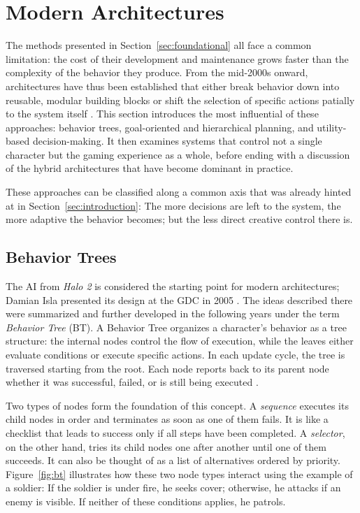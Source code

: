 \section{Modern Architectures}
\label{sec:modern}

The methods presented in Section~\ref{sec:foundational} all face a common limitation: the cost of their development and maintenance grows faster than the complexity of the behavior they produce. From the mid-2000s onward, architectures have thus been established that either break behavior down into reusable, modular building blocks or shift the selection of specific actions patially to the system itself \cite{millington2009,yannakakis2018}. This section introduces the most influential of these approaches: behavior trees, goal-oriented and hierarchical planning, and utility-based decision-making. It then examines systems that control not a single character but the gaming experience as a whole, before ending with a discussion of the hybrid architectures that have become dominant in practice.

These approaches can be classified along a common axis that was already hinted at in Section~\ref{sec:introduction}: The more decisions are left to the system, the more adaptive the behavior becomes; but the less direct creative control there is.

\subsection{Behavior Trees}

The AI from \emph{Halo 2} is considered the starting point for modern architectures; Damian Isla presented its design at the GDC in 2005 \cite{isla2005}. The ideas described there were summarized and further developed in the following years under the term \emph{Behavior Tree} (BT). A Behavior Tree organizes a character’s behavior as a tree structure: the internal nodes control the flow of execution, while the leaves either evaluate conditions or execute specific actions. In each update cycle, the tree is traversed starting from the root. Each node reports back to its parent node whether it was successful, failed, or is still being executed \cite{colledanchise2018,champandard2013}.

Two types of nodes form the foundation of this concept. A \emph{sequence} executes its child nodes in order and terminates as soon as one of them fails. It is like a checklist that leads to success only if all steps have been completed. A \emph{selector}, on the other hand, tries its child nodes one after another until one of them succeeds. It can also be thought of as a list of alternatives ordered by priority. Figure~\ref{fig:bt} illustrates how these two node types interact using the example of a soldier: If the soldier is under fire, he seeks cover; otherwise, he attacks if an enemy is visible. If neither of these conditions applies, he patrols.

